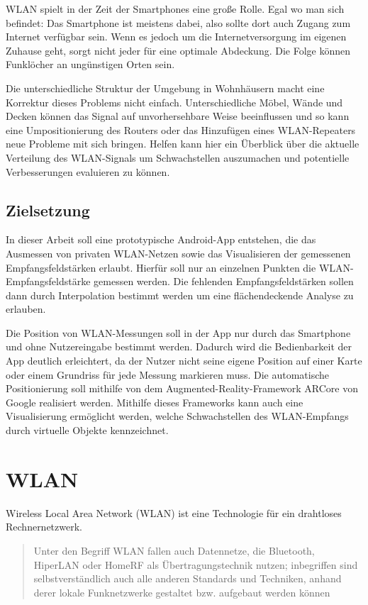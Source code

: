\documentclass[10pt]{scrartcl}
\begin{document}
WLAN spielt in der Zeit der Smartphones eine große Rolle. Egal wo man sich befindet: Das Smartphone ist meistens dabei, also sollte dort auch Zugang zum Internet verfügbar sein. Wenn es jedoch um die Internetversorgung im eigenen Zuhause geht, sorgt nicht jeder für eine optimale Abdeckung. Die Folge können Funklöcher an ungünstigen Orten sein.

Die unterschiedliche Struktur der Umgebung in Wohnhäusern macht eine Korrektur dieses Problems nicht einfach. Unterschiedliche Möbel, Wände und Decken können das Signal auf unvorhersehbare Weise beeinflussen und so kann eine Umpositionierung des Routers oder das Hinzufügen eines WLAN-Repeaters neue Probleme mit sich bringen. Helfen kann hier ein Überblick über die aktuelle Verteilung des WLAN-Signals um Schwachstellen auszumachen und potentielle Verbesserungen evaluieren zu können.

\subsection{Zielsetzung}
In dieser Arbeit soll eine prototypische Android-App entstehen, die das Ausmessen von privaten WLAN-Netzen sowie das Visualisieren der gemessenen Empfangsfeldstärken erlaubt. Hierfür soll nur an einzelnen Punkten die WLAN-Empfangsfeldstärke gemessen werden. Die fehlenden Empfangsfeldstärken sollen dann durch Interpolation bestimmt werden um eine flächendeckende Analyse zu erlauben.

Die Position von WLAN-Messungen soll in der App nur durch das Smartphone und ohne Nutzereingabe bestimmt werden. Dadurch wird die Bedienbarkeit der App deutlich erleichtert, da der Nutzer nicht seine eigene Position auf einer Karte oder einem Grundriss für jede Messung markieren muss. Die automatische Positionierung soll mithilfe von dem Augmented-Reality-Framework ARCore von Google realisiert werden. Mithilfe dieses Frameworks kann auch eine Visualisierung ermöglicht werden, welche Schwachstellen des WLAN-Empfangs durch virtuelle Objekte kennzeichnet.

\newpage

\section{WLAN}
Wireless Local Area Network (WLAN) ist eine Technologie für ein drahtloses Rechnernetzwerk.

\blockcquote{ipwlan}{Unter den Begriff WLAN fallen auch Datennetze, die Bluetooth, HiperLAN oder HomeRF als Übertragungstechnik nutzen; inbegriffen sind selbstverständlich auch alle anderen Standards und Techniken, anhand derer lokale Funknetzwerke gestaltet bzw. aufgebaut werden können}.
\end{document}
